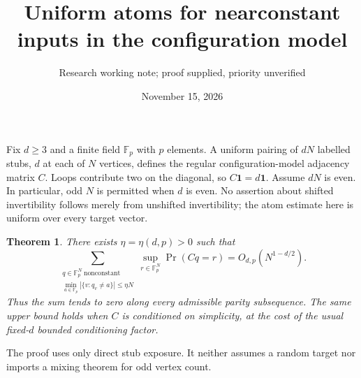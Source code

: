 \documentclass[11pt]{article}
\title{Uniform atoms for nearconstant inputs in the configuration model}
\author{Research working note; proof supplied, priority unverified}
\date{November 15, 2026}
\newtheorem{theorem}{Theorem}
\newcommand{\Fp}{\mathbb F_p}
\begin{document}
\maketitle

Fix $d\ge3$ and a finite field $\Fp$ with $p$ elements. A uniform pairing
of $dN$ labelled stubs, $d$ at each of $N$ vertices, defines the regular
configuration-model adjacency matrix $C$. Loops contribute two on the
diagonal, so $C\mathbf1=d\mathbf1$. Assume $dN$ is even. In particular,
odd $N$ is permitted when $d$ is even. No assertion about shifted
invertibility follows merely from unshifted invertibility; the atom
estimate here is uniform over every target vector.

\begin{theorem}\label{thm:nearconstant}
There exists $\eta=\eta(d,p)>0$ such that
\[
 \sum_{\substack{q\in\Fp^N\ \mathrm{nonconstant}\\
 \min_{a\in\Fp}|\{v:q_v\ne a\}|\le\eta N}}
 \sup_{r\in\Fp^N}\Pr(Cq=r)
 =O_{d,p}(N^{1-d/2}).
\]
Thus the sum tends to zero along every admissible parity subsequence.
The same upper bound holds when $C$ is conditioned on simplicity, at
the cost of the usual fixed-$d$ bounded conditioning factor.
\end{theorem}

The proof uses only direct stub exposure. It neither assumes a random
target nor imports a mixing theorem for odd vertex count.
\end{document}

